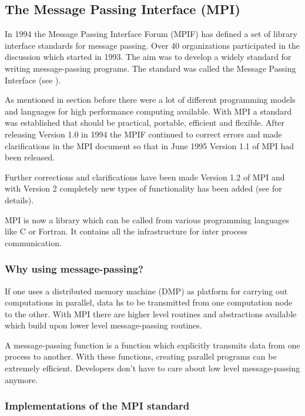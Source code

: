 \subsection{The Message Passing Interface (MPI)}
\label{MPI}

In 1994 the Message Passing Interface Forum (MPIF) has defined a set
of library interface standards for message passing. Over 40
organizations participated in the discussion which started in
1993. The aim was to develop a widely standard for writing
message-passing programs. The standard was called the Message Passing
Interface (see \cite{forum94:MPI}).

As mentioned in section \cite{sec:programming_models} before there
were a lot of different programming models and languages for high
performance computing available. With MPI a standard was established
that should be practical, portable, efficient and flexible. After
releasing Version 1.0 in 1994 the MPIF continued to correct errors and
made clarifications in the MPI document so that in June 1995 Version
1.1 of MPI had been released.

Further corrections and clarifications have been made Version 1.2 of
MPI and with Version 2 completely new types of functionality has been
added (see \cite{forum94:MPI-2} for details).

MPI is now a library which can be called from various programming
languages like C or Fortran. It contains all the infrastructure for
inter process communication.



\subsubsection{Why using message-passing?}
\label{sec:why_m-p}

If one uses a distributed memory machine (DMP) as platform for
carrying out computations in parallel, data hs to be transmitted from
one computation node to the other. With MPI there are higher level
routines and abstractions available which build upon lower level
message-passing routines.
  
A message-passing function is a function which explicitly transmits
data from one process to another. With these
functions, creating parallel programs can be extremely
efficient. Developers don't have to care about low level
message-passing anymore.

\subsubsection{Implementations of the MPI standard}


